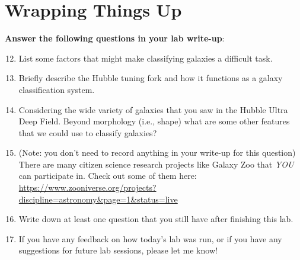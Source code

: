 \documentclass[11pt]{article}
\begin{document}
\section{Wrapping Things Up}
\textbf{Answer the following questions in your lab write-up}:
\begin{enumerate}
\setcounter{enumi}{11}
    
    \item List some factors that might make classifying galaxies a difficult task.
    
    \item Briefly describe the Hubble tuning fork and how it functions as a galaxy classification system.
    
    \item Considering the wide variety of galaxies that you saw in the Hubble Ultra Deep Field. Beyond morphology (i.e., shape) what are some other features that we could use to classify galaxies?
    
    \item (Note: you don't need to record anything in your write-up for this question) There are many citizen science research projects like Galaxy Zoo that \emph{YOU} can participate in. Check out some of them here: \url{https://www.zooniverse.org/projects?discipline=astronomy&page=1&status=live}
    
    \item Write down at least one question that you still have after finishing this lab.
    
    \item If you have any feedback on how today's lab was run, or if you have any suggestions for future lab sessions, please let me know!
\end{enumerate}
\end{document}
